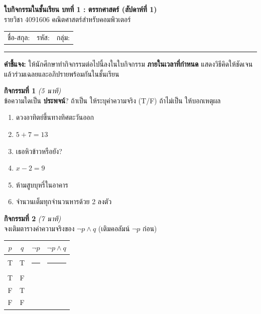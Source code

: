 \documentclass[a4paper,12pt]{article}
\begin{document}
\thispagestyle{empty}

\begin{center}
  {\Large\bfseries\color{navy} ใบกิจกรรมในชั้นเรียน บทที่ 1 : ตรรกศาสตร์ (สัปดาห์ที่ 1)}\\[0.2em]
  {\normalsize รายวิชา 4091606 คณิตศาสตร์สำหรับคอมพิวเตอร์}
\end{center}
\vspace{0.3em}
\noindent\begin{tabular}{@{}p{} p{} p{}@{}}
  ชื่อ-สกุล: \dotfill & รหัส: \dotfill & กลุ่ม: \dotfill
\end{tabular}
\hrule
\vspace{0.6em}
\noindent\textbf{คำชี้แจง:} ให้นักศึกษาทำกิจกรรมต่อไปนี้ลงในใบกิจกรรม \textbf{ภายในเวลาที่กำหนด}
แสดงวิธีคิดให้ชัดเจน แล้วร่วมเฉลยและอภิปรายพร้อมกันในชั้นเรียน
\vspace{0.6em}

\noindent\textbf{กิจกรรมที่ 1} \hfill \textit{(5 นาที)}\\
ข้อความใดเป็น \textbf{ประพจน์}? ถ้าเป็น ให้ระบุค่าความจริง (T/F) ถ้าไม่เป็น ให้บอกเหตุผล
\begin{enumerate}[label=\arabic*)]
  \item ดวงอาทิตย์ขึ้นทางทิศตะวันออก \hfill \dotfill
  \item $5 + 7 = 13$ \hfill \dotfill
  \item เธอหิวข้าวหรือยัง? \hfill \dotfill
  \item $x - 2 = 9$ \hfill \dotfill
  \item ห้ามสูบบุหรี่ในอาคาร \hfill \dotfill
  \item จำนวนเต็มทุกจำนวนหารด้วย 2 ลงตัว \hfill \dotfill
\end{enumerate}
\vspace{0.4em}

\noindent\textbf{กิจกรรมที่ 2} \hfill \textit{(7 นาที)}\\
จงเติมตารางค่าความจริงของ \quad $\neg p \land q$ \quad (เติมคอลัมน์ $\neg p$ ก่อน)
\begin{center}
\begin{tabular}{|c|c|c|c|}
  \hline
  \textbf{$p$} & \textbf{$q$} & \textbf{$\neg p$} & \textbf{$\neg p \land q$} \\ \hline
  T & T & \rule{2.2cm}{0pt} & \rule{2.2cm}{0pt} \\ \hline
  T & F &  &  \\ \hline
  F & T &  &  \\ \hline
  F & F &  &  \\ \hline
\end{tabular}
\end{center}
\vspace{0.4em}
\end{document}
